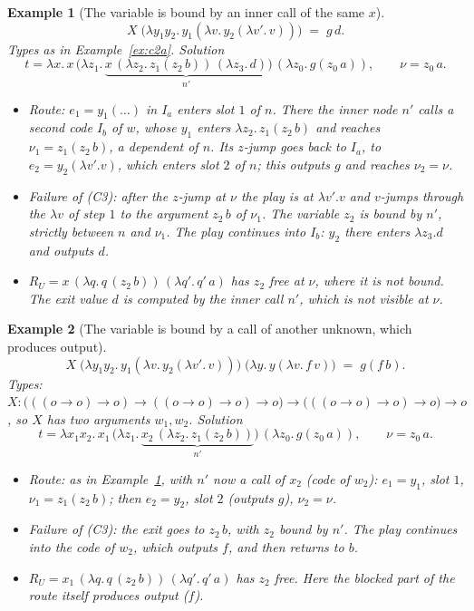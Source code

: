 \documentclass[11pt]{article}
\newtheorem{example}{Example}
\begin{document}
\begin{example}[The variable is bound by an inner call of the same $x$]\label{ex:c3a}
\[
X\;\bigl(\lambda y_1y_2.\,y_1(\lambda v.\,y_2(\lambda v'.\,v))\bigr)\;=\;g\,d.
\]
Types as in Example~\ref{ex:c2a}.  Solution
\[
t=\lambda x.\,x\,\bigl(\lambda z_1.\,\underbrace{x\,(\lambda z_2.\,z_1(z_2\,b))\,(\lambda z_3.\,d)}_{n'}\bigr)\,(\lambda z_0.\,g(z_0\,a)),
\qquad \nu=z_0\,a .
\]
\begin{itemize}
\item Route: $e_1=y_1(\dots)$ in $I_a$ enters slot $1$ of $n$.  There the
  inner node $n'$ calls a second code $I_b$ of $w$, whose $y_1$ enters
  $\lambda z_2.\,z_1(z_2\,b)$ and reaches $\nu_1=z_1(z_2\,b)$, a dependent of
  $n$.  Its $z$-jump goes back to $I_a$, to $e_2=y_2(\lambda v'.v)$, which
  enters slot $2$ of $n$; this outputs $g$ and reaches $\nu_2=\nu$.
\item Failure of (C3): after the $z$-jump at $\nu$ the play is at
  $\lambda v'.v$ and $v$-jumps through the $\lambda v$ of step $1$ to the
  argument $z_2\,b$ of $\nu_1$.  The variable $z_2$ is bound by $n'$,
  strictly between $n$ and $\nu_1$.  The play continues into $I_b$:
  $y_2$ there enters $\lambda z_3.d$ and outputs $d$.
\item $R_U=x\,(\lambda q.\,q\,(z_2\,b))\,(\lambda q'.\,q'\,a)$ has $z_2$
  free at $\nu$, where it is not bound.  The exit value $d$ is computed
  by the inner call $n'$, which is not visible at $\nu$.
\end{itemize}
\end{example}

\begin{example}[The variable is bound by a call of another unknown, which produces output]\label{ex:c3b}
\[
X\;\bigl(\lambda y_1y_2.\,y_1(\lambda v.\,y_2(\lambda v'.\,v))\bigr)\;\bigl(\lambda y.\,y(\lambda v.\,f\,v)\bigr)\;=\;g(f\,b).
\]
Types: $X:\bigl(((o\to o)\to o)\to((o\to o)\to o)\to o\bigr)\to\bigl(((o\to o)\to o)\to o\bigr)\to o$, so $X$ has two arguments $w_1,w_2$.  Solution
\[
t=\lambda x_1x_2.\,x_1\,\bigl(\lambda z_1.\,\underbrace{x_2\,(\lambda z_2.\,z_1(z_2\,b))}_{n'}\bigr)\,(\lambda z_0.\,g(z_0\,a)),
\qquad \nu=z_0\,a .
\]
\begin{itemize}
\item Route: as in Example~\ref{ex:c3a}, with $n'$ now a call of $x_2$
  (code of $w_2$): $e_1=y_1$, slot $1$, $\nu_1=z_1(z_2\,b)$; then
  $e_2=y_2$, slot $2$ (outputs $g$), $\nu_2=\nu$.
\item Failure of (C3): the exit goes to $z_2\,b$, with $z_2$ bound by $n'$.
  The play continues into the code of $w_2$, which outputs $f$, and then
  returns to $b$.
\item $R_U=x_1\,(\lambda q.\,q\,(z_2\,b))\,(\lambda q'.\,q'\,a)$ has $z_2$
  free.  Here the blocked part of the route itself produces output ($f$).
\end{itemize}
\end{example}
\end{document}
